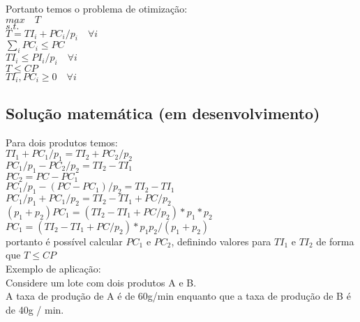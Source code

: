 \documentclass{book}
\begin{document}
Portanto temos o problema de otimização: \\


$max \quad T$ \\

$s.t.$ \\

$T = TI_{i} + PC_i/p_i \quad \forall i$ \\

$\sum_i PC_i \leq PC$ \\

$TI_i \leq PI_i/p_i \quad \forall i$ \\

$T \leq CP$ \\

$TI_i, PC_i \geq 0 \quad \forall i$ \\

\subsection{Solução matemática (em desenvolvimento)}

Para dois produtos temos: \\

$TI_{1} + PC_1/p_1 = TI_{2} + PC_2/p_2$ \\

$PC_1/p_1 - PC_2/p_2 = TI_{2} - TI_{1}$ \\

$PC_2 = PC - PC_1$ \\

$PC_1/p_1 - (PC - PC_1)/p_2 = TI_{2} - TI_{1}$ \\

$PC_1/p_1 + PC_1/p_2 = TI_{2} - TI_{1} + PC/p_2$ \\

$(p_1 + p_2) PC_1 = (TI_{2} - TI_{1} + PC/p_2)*p_1*p_2$ \\

$PC_1 = (TI_{2} - TI_{1} + PC/p_2)*p_1p_2/(p_1 + p_2) $ \\

portanto é possível calcular $PC_1$ e $PC_2$, definindo valores para $TI_1$ e $TI_2$ de forma que $T \leq CP$ \\

Exemplo de aplicação: \\

Considere um lote com dois produtos A e B. \\

A taxa de produção de A é de 60g/min enquanto que a taxa de produção de B é de 40g / min. \\
\end{document}
